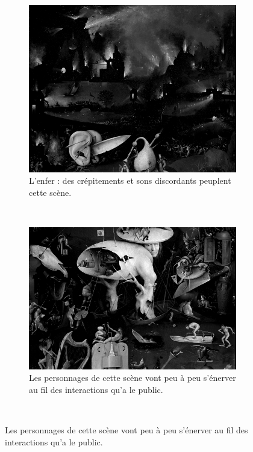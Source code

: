 \begin{subfigure}[t]{0.45\textwidth}
\centering
\begin{subfigure}[t]{\textwidth}
    \centering
    \includegraphics[width=\textwidth]{images/C1.png}
    \caption{L'enfer : des crépitements et sons discordants peuplent cette scène.}
    \label{fig.c1}
\end{subfigure}~\\
\begin{subfigure}[t]{\textwidth}
    \centering
    \includegraphics[width=\textwidth]{images/C2.png}
    \caption{Les personnages de cette scène vont peu à peu s'énerver au fil des interactions qu'a le public.}
    \label{fig.c2}
\end{subfigure}~\\

\end{subfigure}
